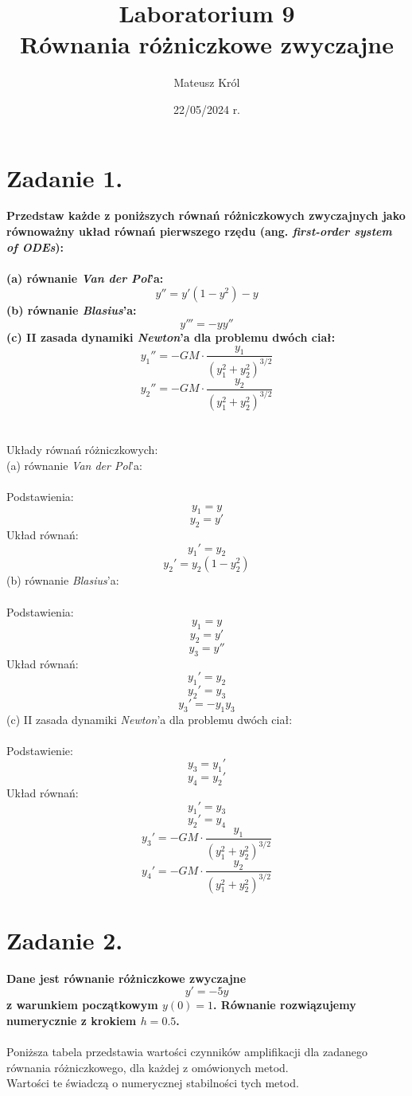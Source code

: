 \documentclass{article}
\title{%
Laboratorium 9\\
  \huge Równania różniczkowe zwyczajne}
\author{Mateusz Król}
\date{22/05/2024 r.}
\begin{document}
\maketitle

 
\section*{Zadanie 1.}
\textbf{Przedstaw każde z poniższych równań różniczkowych zwyczajnych
jako równoważny układ równań pierwszego rzędu (ang. \textit{first-order system of ODEs}):\\\\
(a) równanie \textit{Van der Pol}'a:
$$y'' = y'(1-y^2) - y$$
(b) równanie \textit{Blasius}'a:
$$y''' = -yy''$$
(c) II zasada dynamiki \textit{Newton}'a dla problemu dwóch ciał:
$$y_1'' = -GM\cdot \frac{y_1}{(y_1^2+y_2^2)^{3/2}}$$
$$y_2'' = -GM\cdot \frac{y_2}{(y_1^2+y_2^2)^{3/2}}$$
}\\\\

Układy równań różniczkowych:\\
(a) równanie \textit{Van der Pol}'a:\\\\
Podstawienia:
    $$y_1=y$$
    $$y_2=y'$$
Układ równań:
    $$y_1'=y_2$$
    $$y_2'=y_2(1-y_2^2)$$
(b) równanie \textit{Blasius}'a:\\\\
Podstawienia:
    $$y_1=y$$
    $$y_2=y'$$
    $$y_3=y''$$
Układ równań:
    $$y_1'=y_2$$
    $$y_2'=y_3$$
    $$y_3'=-y_1y_3$$
(c) II zasada dynamiki \textit{Newton}'a dla problemu dwóch ciał:\\\\
Podstawienie:
    $$y_3=y_1'$$
    $$y_4=y_2'$$
Układ równań:
    $$y_1'=y_3$$
    $$y_2'=y_4$$
    $$y_3'=-GM\cdot \frac{y_1}{(y_1^2+y_2^2)^{3/2}}$$
    $$y_4'=-GM\cdot \frac{y_2}{(y_1^2+y_2^2)^{3/2}}$$

\section*{Zadanie 2.}
\textbf{Dane jest równanie różniczkowe zwyczajne
$$y'=-5y$$
z warunkiem początkowym $y(0) = 1$. Równanie rozwiązujemy numerycznie z
krokiem $h = 0.5$.
}\\\\

Poniższa tabela przedstawia wartości czynników amplifikacji dla zadanego
równania różniczkowego, dla każdej z omówionych metod.\\
Wartości te świadczą o numerycznej stabilności tych metod.
\end{document}
